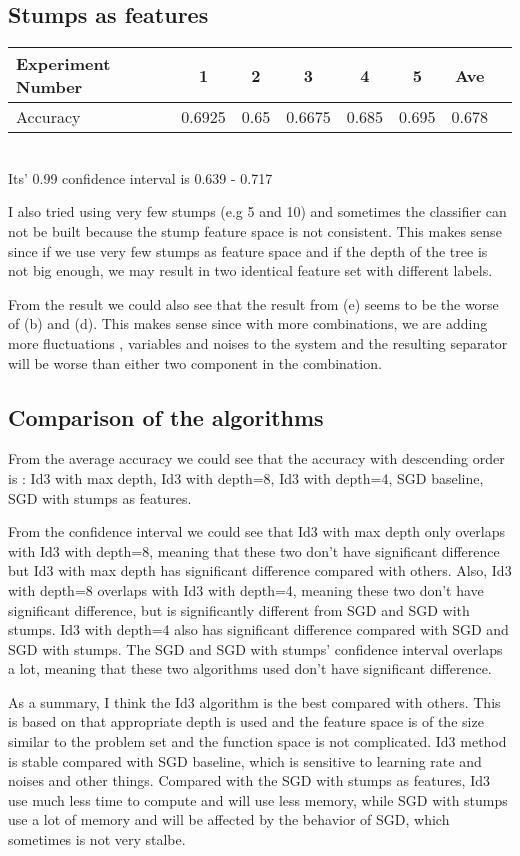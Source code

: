 \subsection{Stumps as features}
\begin{tabular}{l*{6}{c}r}
	Experiment Number  & 1 & 2 & 3 & 4 & 5  & Ave  \\
	\hline
	Accuracy      & 0.6925 & 0.65 & 0.6675 & 0.685 & 0.695 & 0.678   \\
\end{tabular}
\\Its' 0.99 confidence interval is 0.639 - 0.717

\noindent I also tried using very few stumps (e.g 5 and 10) and sometimes the classifier can not be built because the stump feature space is not consistent. This makes sense since if we use very few stumps as feature space and if the depth of the tree is not big enough, we may result in two identical feature set with different labels.

\noindent From the result we could also see that the result from (e) seems to be the worse of (b) and (d). This makes sense since with more combinations, we are adding more fluctuations , variables and noises to the system and the resulting separator will be worse than either two component in the combination. 
\subsection{Comparison of the algorithms}
From the average accuracy we could see that the accuracy with descending order is : Id3 with max depth, Id3 with depth=8, Id3 with depth=4, SGD baseline, SGD with stumps as features.

\noindent From the confidence interval we could see that Id3 with max depth only overlaps with Id3 with depth=8, meaning that these two don't have significant difference but Id3 with max depth has significant difference compared with others. Also, Id3 with depth=8 overlaps with Id3 with depth=4, meaning these two don't have significant difference, but is significantly different from SGD and SGD with stumps. Id3 with depth=4 also has significant difference compared with SGD and SGD with stumps. The SGD and SGD with stumps' confidence interval overlaps a lot, meaning that these two algorithms used don't have significant difference.

\noindent As a summary, I think the Id3 algorithm is the best compared with others. This is based on that appropriate depth is used and the feature space is of the size similar to the problem set and the function space is not complicated. Id3 method is stable compared with SGD baseline, which is sensitive to learning rate and noises and other things. Compared with the SGD with stumps as features, Id3 use much less time to compute and will use less memory, while SGD with stumps use a lot of memory and will be affected by the behavior of SGD, which sometimes is not very stalbe. 

